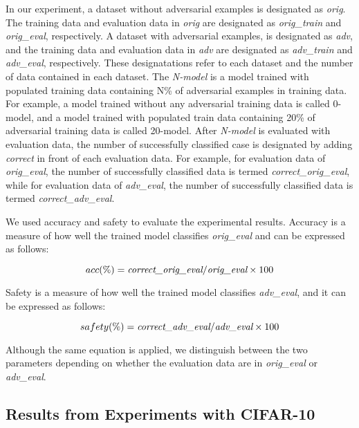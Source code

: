 \documentclass[symmetry,article,submit,moreauthors,pdftex]{Definitions/mdpi}
\begin{document}
In our experiment, a dataset without adversarial examples is designated as {\it orig}. The training data and evaluation data in {\it orig} are designated as {\it orig\_train} and {\it orig\_eval}, respectively.
A dataset with adversarial examples, is designated as {\it adv}, and the training data and evaluation data in {\it adv} are designated as {\it adv\_train} and {\it adv\_eval}, respectively.
These designatations refer to each dataset and the number of data contained in each dataset.
The {\it N-model} is a model trained with populated training data containing N\% of adversarial examples in training data.
For example, a model trained without any adversarial training data is called 0-model, and a model trained with populated train data containing 20\% of adversarial training data is called 20-model.
After {\it N-model} is evaluated with evaluation data, the number of successfully classified case is designated by adding {\it correct} in front of each evaluation data.
For example, for evaluation data of {\it orig\_eval}, the number of successfully classified data is termed {\it correct\_orig\_eval}, while for evaluation data of {\it adv\_eval}, the number of successfully classified data is termed {\it correct\_adv\_eval}.

We used accuracy and safety to evaluate the experimental results. Accuracy is a measure of how well the trained model classifies {\it orig\_eval} and can be expressed as follows:

\begin{equation}
    acc(\%) = \text{{\it correct\_orig\_eval}} / \text{{\it orig\_eval}} \times 100
\end{equation} 

Safety is a measure of how well the trained model classifies {\it adv\_eval}, and it can be expressed as follows:

\begin{equation}
    safety(\%) = \text{{\it correct\_adv\_eval}} / \text{{\it adv\_eval}} \times 100
\end{equation}

Although the same equation is applied, we distinguish between the two parameters depending on whether the evaluation data are in {\it orig\_eval} or {\it adv\_eval}.

\subsection{Results from Experiments with CIFAR-10}
\end{document}
